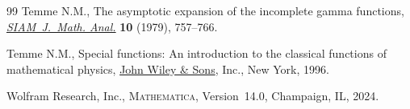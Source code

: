 \documentclass[11pt]{article}
\numberwithin{equation}{section}
\numberwithin{equation}{section}
\begin{document}
\begin{thebibliography}{99}
Temme N.M., The asymptotic expansion of the incomplete gamma functions,
 \href{https://doi.org/10.1137/0510071}{\textit{SIAM~J.~Math. Anal.}} \textbf{10} (1979), 757--766.

Temme N.M., Special functions: {A}n introduction to the classical functions of
 mathematical physics, \href{https://doi.org/10.1002/9781118032572}{John Wiley \& Sons}, Inc., New York, 1996.

Wolfram Research, Inc., \textsc{Mathematica}, Version~14.0, Champaign, IL,
 2024.

\end{thebibliography}
\end{document}
